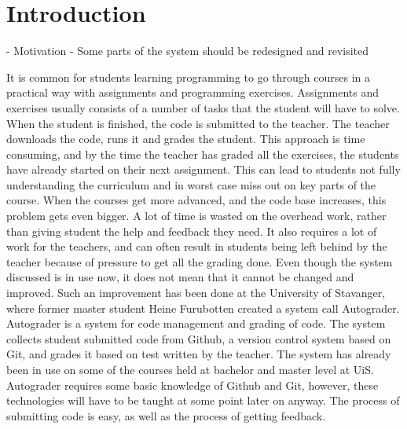 

%
\maketitle
\chapter{Introduction}

- Motivation
- Some parts of the system should be redesigned and revisited


It is common for students learning programming to go through courses in a practical way with assignments and programming exercises. Assignments and exercises usually consists of a number of tasks that the student will have to solve. When the student is finished, the code is submitted to the teacher. The teacher downloads the code, runs it and grades the student. This approach is time consuming, and by the time the teacher has graded all the exercises, the students have already started on their next assignment. This can lead to students not fully understanding the curriculum and in worst case miss out on key parts of the course. When the courses get more advanced, and the code base increases, this problem gets even bigger. A lot of time is wasted on the overhead work, rather than giving student the help and feedback they need. It also requires a lot of work for the teachers, and can often result in students being left behind by the teacher because of pressure to get all the grading done. Even though the system discussed is in use now, it does not mean that it cannot be changed and improved. Such an improvement has been done at the University of Stavanger, where former master student Heine Furubotten created a system call Autograder. Autograder is a system for code management and grading of code. The system collects student submitted code from Github, a version control system based on Git, and grades it based on test written by the teacher. The system has already been in use on some of the courses held at bachelor and master level at UiS. Autograder requires some basic knowledge of Github and Git, however, these technologies will have to be taught at some point later on anyway. The process of submitting code is easy, as well as the process of getting feedback. 

